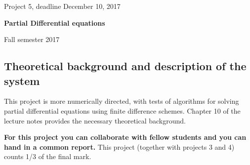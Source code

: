 \documentclass[%
oneside,                 %
final,                   %
10pt]{article}
\begin{document}

\newcommand{\exercisesection}[1]{\subsection*{#1}}






\thispagestyle{empty}

\begin{center}
{\LARGE\bf
\begin{spacing}{1.25}
Project 5, deadline  December 10, 2017
\end{spacing}
}
\end{center}


\begin{center}
{\bf Partial Differential equations${}^{}$} \\ [0mm]
\end{center}

\begin{center}
\end{center}
    

\begin{center}
Fall semester 2017
\end{center}

\vspace{1cm}


\subsection*{Theoretical background and description of the system}

This project is more numerically directed, with tests
of algorithms for solving partial differential equations using finite difference schemes. 
Chapter 10 of the lecture notes provides the necessary theoretical background.

\textbf{For this project you can collaborate with fellow students and you can  hand in a common report.}
This project (together with projects 3 and 4) counts 1/3 of the final mark.
\end{document}
